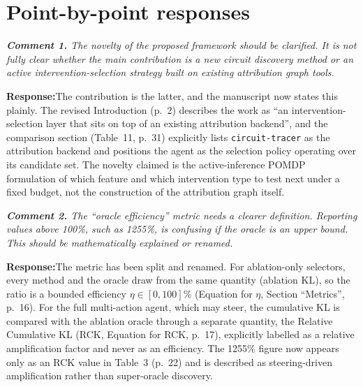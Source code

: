 \documentclass[11pt]{article}
\newenvironment{comment}{%
  \def\FrameCommand{{\color{commentrule}\vrule width 3pt}\hspace{0pt}%
    \fboxsep=8pt\colorbox{commentbg}}%
  \MakeFramed{\advance\hsize-\width\FrameRestore}%
  \itshape\small}{\endMakeFramed}
\newcommand{\reviewerpoint}[1]{\medskip\noindent\textbf{Comment #1.}\;}
\newcommand{\response}{\par\smallskip\noindent\textbf{Response:}\;}
\begin{document}
\section*{Point-by-point responses}

\begin{comment}
\reviewerpoint{1} The novelty of the proposed framework should be clarified.
It is not fully clear whether the main contribution is a new circuit discovery
method or an active intervention-selection strategy built on existing attribution
graph tools.
\end{comment}
\response The contribution is the latter, and the manuscript now states this
plainly. The revised Introduction (p.~2) describes the work as ``an
intervention-selection layer that sits on top of an existing attribution
backend'', and the comparison section (Table~11, p.~31) explicitly lists
\texttt{circuit-tracer} as the attribution backend and
positions the agent as the selection policy operating over its candidate set.
The novelty claimed is the active-inference POMDP formulation of which
feature and which intervention type to test next under a fixed budget, not the
construction of the attribution graph itself.

\begin{comment}
\reviewerpoint{2} The ``oracle efficiency'' metric needs a clearer definition.
Reporting values above 100\%, such as 1255\%, is confusing if the oracle is an
upper bound. This should be mathematically explained or renamed.
\end{comment}
\response The metric has been split and renamed. For ablation-only selectors,
every method and the oracle draw from the same quantity (ablation KL), so the
ratio is a bounded efficiency $\eta\in[0,100]\%$
(Equation for $\eta$, Section ``Metrics'', p.~16). For the full multi-action
agent, which may steer, the cumulative KL is compared with the ablation oracle
through a separate quantity, the Relative Cumulative KL
(RCK, Equation for RCK, p.~17), explicitly labelled as a relative amplification
factor and never as an efficiency. The 1255\% figure now appears only as an RCK
value in Table~3 (p.~22) and is described as steering-driven amplification rather
than super-oracle discovery.
\end{document}

